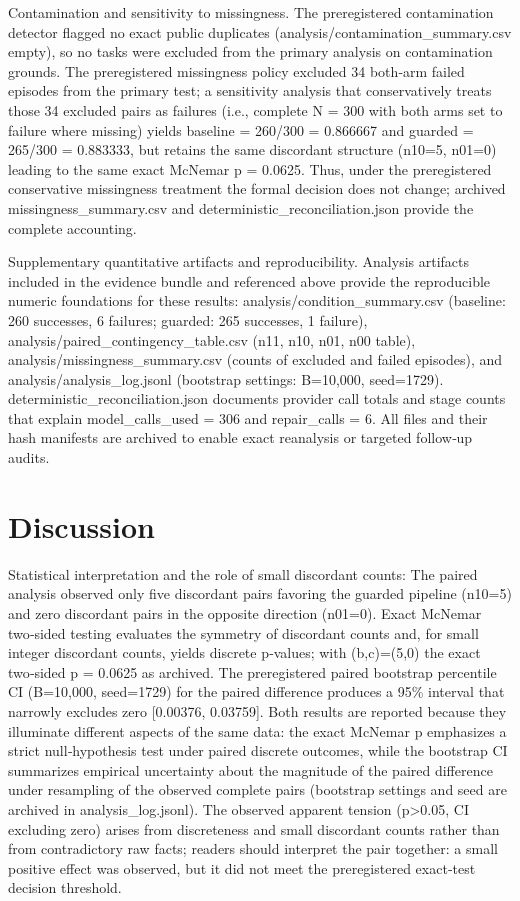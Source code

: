 \documentclass[conference]{IEEEtran}
\begin{document}
Contamination and sensitivity to missingness. The preregistered contamination detector flagged no exact public duplicates (analysis/contamination\_summary.csv empty), so no tasks were excluded from the primary analysis on contamination grounds. The preregistered missingness policy excluded 34 both‑arm failed episodes from the primary test; a sensitivity analysis that conservatively treats those 34 excluded pairs as failures (i.e., complete N = 300 with both arms set to failure where missing) yields baseline = 260/300 = 0.866667 and guarded = 265/300 = 0.883333, but retains the same discordant structure (n10=5, n01=0) leading to the same exact McNemar p = 0.0625. Thus, under the preregistered conservative missingness treatment the formal decision does not change; archived missingness\_summary.csv and deterministic\_reconciliation.json provide the complete accounting.

Supplementary quantitative artifacts and reproducibility. Analysis artifacts included in the evidence bundle and referenced above provide the reproducible numeric foundations for these results: analysis/condition\_summary.csv (baseline: 260 successes, 6 failures; guarded: 265 successes, 1 failure), analysis/paired\_contingency\_table.csv (n11, n10, n01, n00 table), analysis/missingness\_summary.csv (counts of excluded and failed episodes), and analysis/analysis\_log.jsonl (bootstrap settings: B=10,000, seed=1729). deterministic\_reconciliation.json documents provider call totals and stage counts that explain model\_calls\_used = 306 and repair\_calls = 6. All files and their hash manifests are archived to enable exact reanalysis or targeted follow‑up audits.

\section{Discussion}
Statistical interpretation and the role of small discordant counts: The paired analysis observed only five discordant pairs favoring the guarded pipeline (n10=5) and zero discordant pairs in the opposite direction (n01=0). Exact McNemar two‑sided testing evaluates the symmetry of discordant counts and, for small integer discordant counts, yields discrete p‑values; with (b,c)=(5,0) the exact two‑sided p = 0.0625 as archived. The preregistered paired bootstrap percentile CI (B=10,000, seed=1729) for the paired difference produces a 95\% interval that narrowly excludes zero [0.00376, 0.03759]. Both results are reported because they illuminate different aspects of the same data: the exact McNemar p emphasizes a strict null‑hypothesis test under paired discrete outcomes, while the bootstrap CI summarizes empirical uncertainty about the magnitude of the paired difference under resampling of the observed complete pairs (bootstrap settings and seed are archived in analysis\_log.jsonl). The observed apparent tension (p>0.05, CI excluding zero) arises from discreteness and small discordant counts rather than from contradictory raw facts; readers should interpret the pair together: a small positive effect was observed, but it did not meet the preregistered exact‑test decision threshold.
\end{document}
